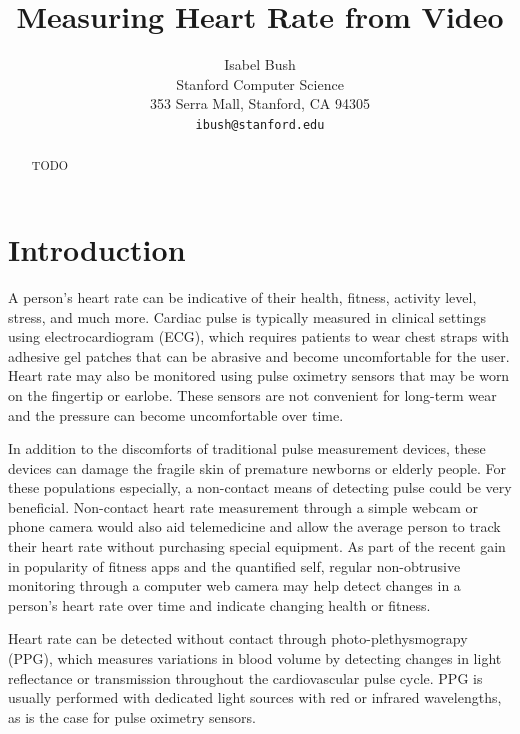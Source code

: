 \documentclass[10pt,twocolumn,letterpaper]{article}
\begin{document}
\title{Measuring Heart Rate from Video}

\author{Isabel Bush\\
Stanford Computer Science\\
353 Serra Mall, Stanford, CA 94305\\
{\tt\small ibush@stanford.edu}
}

\maketitle


\begin{abstract}
   TODO
\end{abstract}

\section{Introduction}

A person's heart rate can be indicative of their health, fitness, activity level, stress, and much more. Cardiac pulse is typically measured in clinical settings using electrocardiogram (ECG), which requires patients to wear chest straps with adhesive gel patches that can be abrasive and become uncomfortable for the user. Heart rate may also be monitored using pulse oximetry sensors that may be worn on the fingertip or earlobe. These sensors are not convenient for long-term wear and the pressure can become uncomfortable over time.

In addition to the discomforts of traditional pulse measurement devices, these devices can damage the fragile skin of premature newborns or elderly people. For these populations especially, a non-contact means of detecting pulse could be very beneficial. Non-contact heart rate measurement through a simple webcam or phone camera would also aid telemedicine and allow the average person to track their heart rate without purchasing special equipment. As part of the recent gain in popularity of fitness apps and the quantified self, regular non-obtrusive monitoring through a computer web camera may help detect changes in a person's heart rate over time and indicate changing health or fitness. 

Heart rate can be detected without contact through photo-plethysmograpy (PPG), which measures variations in blood volume by detecting changes in light reflectance or transmission throughout the cardiovascular pulse cycle. PPG is usually performed with dedicated light sources with red or infrared wavelengths, as is the case for pulse oximetry sensors. 
\end{document}
